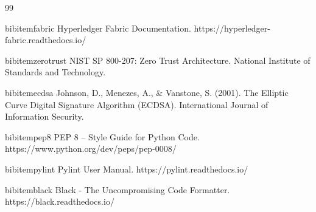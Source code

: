 \documentclass[12pt,a4paper]{report}
\begin{document}
\begin{thebibliography}{99}

bibitem{fabric}
Hyperledger Fabric Documentation.
https://hyperledger-fabric.readthedocs.io/

bibitem{zerotrust}
NIST SP 800-207: Zero Trust Architecture.
National Institute of Standards and Technology.

bibitem{ecdsa}
Johnson, D., Menezes, A., \& Vanstone, S. (2001).
The Elliptic Curve Digital Signature Algorithm (ECDSA).
International Journal of Information Security.

bibitem{pep8}
PEP 8 -- Style Guide for Python Code.
https://www.python.org/dev/peps/pep-0008/

bibitem{pylint}
Pylint User Manual.
https://pylint.readthedocs.io/

bibitem{black}
Black - The Uncompromising Code Formatter.
https://black.readthedocs.io/

\end{thebibliography}

\cleardoublepage
\end{document}

